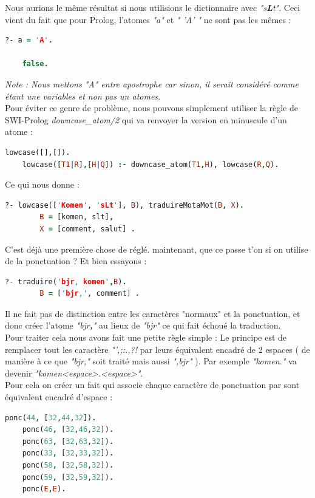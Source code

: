 \documentclass[11pt]{report}
\begin{document}
	Nous aurions le même résultat si nous utilisions le dictionnaire avec {\em "s\textbf{L}t"}. Ceci vient du fait que pour Prolog, l'atomes {\em "a"} et {\em " 'A' "} ne sont pas les mêmes :
	\begin{lstlisting}[language=Prolog]
	?- a = 'A'.
	
	false.
	\end{lstlisting}
	
	{\em Note : Nous mettons "A" entre apostrophe car sinon, il serait considéré comme étant une variables et non pas un atomes.}\\
	
	Pour éviter ce genre de problème, nous pouvons simplement utiliser la règle de SWI-Prolog {\em downcase\_atom/2} qui va renvoyer la version en minuscule d'un atome :
	\begin{lstlisting}[language=Prolog]
	lowcase([],[]).
	lowcase([T1|R],[H|Q]) :- downcase_atom(T1,H), lowcase(R,Q).
	\end{lstlisting}
	
	Ce qui nous donne :
	\begin{lstlisting}[language=Prolog]
	?- lowcase(['Komen', 'sLt'], B), traduireMotaMot(B, X).
		B = [komen, slt],
		X = [comment, salut] .
	\end{lstlisting}
	
	C'est déjà une première chose de réglé. maintenant, que ce passe t'on si on utilise de la ponctuation ? Et bien essayons :
	\begin{lstlisting}[language=Prolog]
	?- traduire('bjr, komen',B).
		B = ['bjr,', comment] .
	\end{lstlisting}
	
	Il ne fait pas de distinction entre les caractères "normaux" et la ponctuation, et donc créer l'atome {\em "bjr\textbf{,}"} au lieux de {\em "bjr"} ce qui fait échoué la traduction.\\
	Pour traiter cela nous avons fait une petite règle simple : Le principe est de remplacer tout les caractère {\em "',;:.,?!} par leurs équivalent encadré de 2 espaces ( de manière à ce que {\em "bjr,"} soit traité mais aussi {\em ",bjr"} ). Par exemple {\em "komen."} va devenir {\em "komen<espace>.<espace>"}.\\
	Pour cela on créer un fait qui associe chaque caractère de ponctuation par sont équivalent encadré d'espace :
	\begin{lstlisting}[language=Prolog]
	ponc(44, [32,44,32]).
	ponc(46, [32,46,32]).
	ponc(63, [32,63,32]).
	ponc(33, [32,33,32]).
	ponc(58, [32,58,32]).
	ponc(59, [32,59,32]).
	ponc(E,E).
	\end{lstlisting}
	
\end{document}
